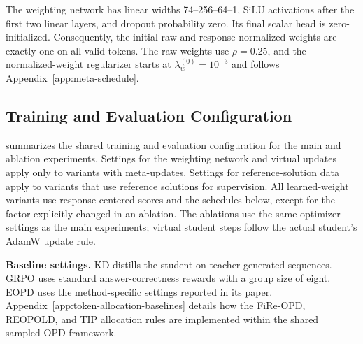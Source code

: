 \documentclass{article}
\theoremstyle{plain}
\theoremstyle{definition}
\theoremstyle{remark}
\begin{document}
The weighting network has linear widths 74--256--64--1, SiLU activations after the first two linear layers, and dropout probability zero. Its final scalar head is zero-initialized. Consequently, the initial raw and response-normalized weights are exactly one on all valid tokens. The raw weights use \(\rho=0.25\), and the normalized-weight regularizer starts at \(\lambda_w^{(0)}=10^{-3}\) and follows Appendix~\ref{app:meta-schedule}.

\subsection{Training and Evaluation Configuration}

 summarizes the shared training and evaluation configuration for the main and ablation experiments.
Settings for the weighting network and virtual updates apply only to variants with meta-updates. Settings for reference-solution data apply to variants that use reference solutions for supervision.
All learned-weight variants use response-centered scores and the schedules below, except for the factor explicitly changed in an ablation.
The ablations use the same optimizer settings as the main experiments; virtual student steps follow the actual student's AdamW update rule.

\textbf{Baseline settings.}
KD distills the student on teacher-generated sequences. GRPO uses standard answer-correctness rewards with a group size of eight. EOPD uses the method-specific settings reported in its paper. Appendix~\ref{app:token-allocation-baselines} details how the FiRe-OPD, REOPOLD, and TIP allocation rules are implemented within the shared sampled-OPD framework.
\end{document}
